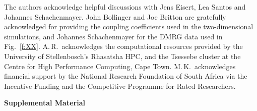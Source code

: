 \documentclass[aps,prl,showpacs,amsmath,amssymb,superscriptaddress,reprint,10pt]{revtex4-1}
\newcommand{\ar}[1]{{\color{analabha} #1}}
\newcommand{\mk}[1]{{\color{michael} #1}}
\begin{document}
\begin{bibunit}
\mk{The authors acknowledge helpful discussions with Jens Eisert, Lea Santos and Johannes Schachenmayer. John Bollinger and Joe Britton are gratefully acknowledged for providing the coupling coefficients used in the two-dimensional simulations, and Johannes Schachenmayer for the DMRG data used in Fig.~\ref{f:XX}.}
\mk{A.\,R.\ acknowledges the computational resources provided by the University of Stellenbosch's Rhasatsha HPC, %
and the Tsessebe cluster at the Centre for High Performance Computing, Cape Town.}  %
M.\,K.\ acknowledges financial support by the National Research Foundation of South Africa via the Incentive Funding and the Competitive Programme for Rated Researchers.

%
\putbib
\end{bibunit}
\clearpage

\bigskip

\newpage
\hbox{}
\newpage

\begin{center}
{\bf Supplemental Material}  
\end{center}
\vspace{-3mm}
\appendix
{}
\end{document}
